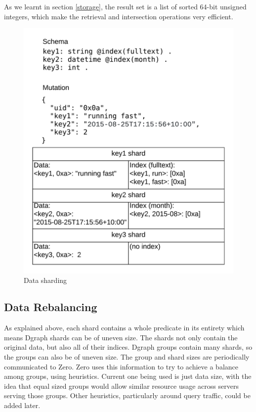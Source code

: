 \documentclass[letterpaper,twocolumn,10pt]{article}
\begin{document}
As we learnt in section \ref{storage}, the result set is a list of sorted 64-bit
unsigned integers, which make the retrieval and intersection operations very efficient.

\begin{figure}[t]
\begin{center}
	\includegraphics[scale=0.5]{datasharding.png}
\end{center}
\caption{Data sharding}
\end{figure}

\subsection{Data Rebalancing} \label{move}

As explained above, each shard contains a whole predicate in its entirety which
means Dgraph shards can be of uneven size. The shards not only contain the
original data, but also all of their indices. Dgraph groups contain many
shards, so the groups can also be of uneven size. The group and shard sizes are
periodically communicated to Zero. Zero uses this information to try to achieve
a balance among groups, using heuristics. Current one being used is just data
size, with the idea that equal sized groups would allow similar resource usage
across servers serving those groups. Other heuristics, particularly around query
traffic, could be added later.
\end{document}
